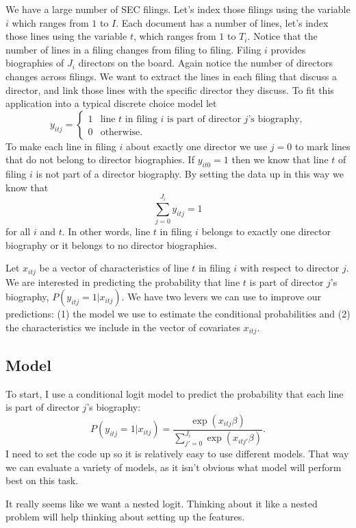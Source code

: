 \documentclass{article}
\newcommand{\1}{\mathds{1}}
\begin{document}
We have a large number of SEC filings. Let's index those filings using
the variable $i$ which ranges from $1$ to $I$. Each document has a
number of lines, let's index those lines using the variable $t$, which
ranges from $1$ to $T_i$. Notice that the number of lines in a filing
changes from filing to filing. Filing $i$ provides biographies of
$J_i$ directors on the board. Again notice the number of directors
changes across filings. We want to extract the lines in each
filing that discuss a director, and link those lines with the specific
director they discuss. To fit this application into a typical discrete
choice model let
\[
y_{itj} = \begin{cases}
1 & \text{line $t$ in filing $i$ is part of director $j$'s biography,} \\
0 & \text{otherwise.}
\end{cases}
\]
To make each line in filing $i$ about exactly one director we
use $j = 0$ to mark lines that do not belong to director
biographies. If $y_{it0} = 1$ then we know that line $t$ of filing $i$
is not part of a director biography. By setting the data up in this
way we know that 
\[
\sum_{j = 0}^{J_i} y_{itj} = 1
\]
for all $i$ and $t$. In other words, line $t$ in filing $i$ belongs to
exactly one director biography or it belongs to no director
biographies.

Let $x_{itj}$ be a vector of characteristics of line $t$ in filing $i$
with respect to director $j$. We are interested in predicting the
probability that line $t$ is part of director $j$'s biography,
$P(y_{itj} = 1 | x_{itj})$. We have two levers we can use
to improve our predictions: (1) the model we use to estimate the
conditional probabilities and (2) the characteristics we include in the vector of covariates
$x_{itj}$.

\subsection{Model}

To start, I use a conditional logit model to predict the probability
that each line is part of director $j$'s biography:
\[
P(y_{itj} = 1 | x_{itj}) = \frac{\exp(x_{itj} \beta)}{\sum_{j'=0}^{J_i}
\exp(x_{itj'} \beta)}.
\]
I need to set the code up so it is relatively easy to use different
models. That way we can evaluate a variety of models, as it isn't
obvious what model will perform best on this task.

It really seems like we want a nested logit. Thinking about it like a
nested problem will help thinking about setting up the features.
\end{document}
